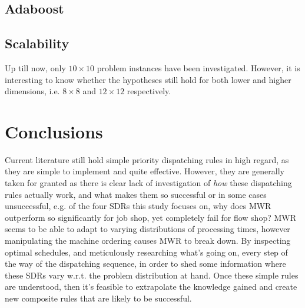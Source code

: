 \documentclass[smallextended]{svjour3}
\begin{document}
	
	\subsection{Adaboost}\label{sec:expr:adaboost}
	\subsection{Scalability}\label{sec:scalability}
	Up till now, only $10\times10$ problem instances have been investigated. However, it is interesting to know whether the hypotheses still hold for both lower and higher dimensions, i.e. $8\times8$ and $12\times12$ respectively.
	
	
	\section{Conclusions}
	
	Current literature still hold simple priority dispatching rules in high regard, as they are simple to implement and quite effective. However, they are generally taken for granted as there is clear lack of investigation of \emph{how} these dispatching rules actually work, and what makes them so successful or in some cases unsuccessful, e.g. of the four SDRs this study focuses on, why does MWR outperform so significantly for job shop, yet completely fail for flow shop? MWR seems to be able to adapt to varying distributions of processing times, however manipulating the machine ordering causes MWR to break down. By inspecting optimal schedules, and meticulously researching what's going on, every step of the way of the dispatching sequence, in order to shed some information where these SDRs vary w.r.t. the problem distribution at hand. Once these simple rules are understood, then it's feasible to extrapolate the knowledge gained and create new composite rules that are likely to be successful. 
	
\end{document}

